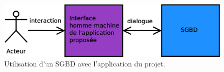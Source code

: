 \begin{figure}[!h]
  \centering
  \includegraphics[width=14cm]{images/avec_idb.eps}
  \caption{Utilisation d'un SGBD avec l'application du projet.}
  \label{avec_idb_schema}
\end{figure}
